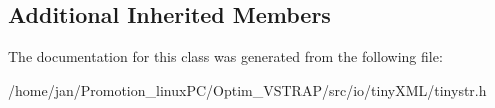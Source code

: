 \subsection*{Additional Inherited Members}


The documentation for this class was generated from the following file\+:\begin{DoxyCompactItemize}
\item 
/home/jan/\+Promotion\+\_\+linux\+P\+C/\+Optim\+\_\+\+V\+S\+T\+R\+A\+P/src/io/tiny\+X\+M\+L/tinystr.\+h\end{DoxyCompactItemize}
